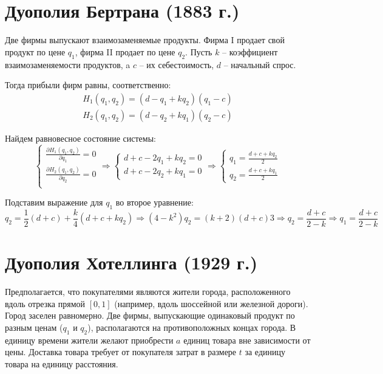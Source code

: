 \documentclass[12pt,a4paper,titlepage,oneside]{book}
\theoremstyle{definition}
\theoremstyle{plain}
\theoremstyle{remark}
\theoremstyle{remark}
\theoremstyle{plain}
\theoremstyle{plain}
\begin{document}
\section{Дуополия Бертрана (1883 г.)}
Две фирмы выпускают взаимозаменяемые продукты. Фирма I продает свой продукт по цене $q_1$, фирма II продает по цене $q_2$. Пусть $k$ -- коэффициент взаимозаменяемости продуктов, a $c$ -- их себестоимость, $d$ -- начальный спрос.

Тогда прибыли фирм равны, соответственно:
\begin{align*}
H_1(q_1,q_2) = (d-q_1 +kq_2)(q_1-c) \\
H_2(q_1,q_2) = (d-q_2 +kq_1)(q_2-c)
\end{align*}

Найдем равновесное состояние системы:
\begin{equation*}
\begin{cases}
\displaystyle \frac{\partial H_1(q_1,q_2)}{\partial q_1} = 0 \\[3ex]
\displaystyle \frac{\partial H_2(q_1,q_2)}{\partial q_2} = 0 \\
\end{cases} 
\Longrightarrow
\begin{cases}
d + c -2q_1 +kq_2 = 0 \\
d + c -2q_2 +kq_1 = 0
\end{cases} 
\Longrightarrow
\begin{cases}
\displaystyle q_1=\frac{d+c+kq_2}{2}\\[3ex]
\displaystyle q_2=\frac{d+c+kq_1}{2}
\end{cases}
\end{equation*}

Подставим выражение для $q_1$ во второе уравнение:
$$q_2 = \frac1{2}(d + c) + \frac{k}{4}(d+c+kq_2) \Rightarrow (4 - k^2)q_2 = (k+2)(d+c){3} \Rightarrow q_2 = \frac{d+c}{2-k} \Rightarrow q_1 = \frac{d+c}{2-k}$$

\section{Дуополия Хотеллинга (1929 г.)}
Предполагается, что покупателями являются жители города, расположенного вдоль отрезка прямой $[0,1]$ (например, вдоль шоссейной или железной дороги). Город заселен равномерно. Две фирмы, выпускающие одинаковый продукт по разным ценам ($q_1$ и $q_2$), располагаются на противоположных концах города. В единицу времени жители желают приобрести $a$ единиц товара вне зависимости от цены. Доставка товара требует от покупателя затрат в размере $t$ за единицу товара на единицу расстояния.
\end{document}
